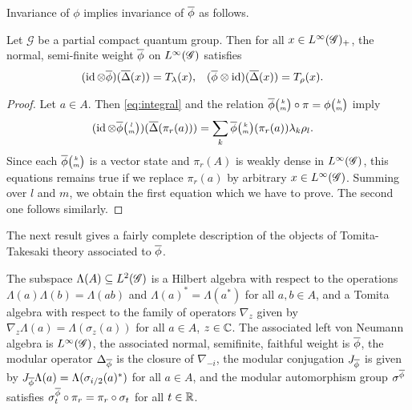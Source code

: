 Invariance of $\phi$ implies invariance of $\overline{\phi}$ as follows.
\begin{Prop} \label{prop:vn-invariance}
  Let $\mathscr{G}$ be a partial compact quantum group. Then for all
  $x\in L^{\infty}(\mathscr{G})_{+}$, the
  normal, semi-finite weight $\overline{\phi}$ on $L^{\infty}(\mathscr{G})$ satisfies
  \begin{align*}
    (\operatorname{id} \otimes \overline{\phi})(\overline{\Delta}(x)) &=  T_{\lambda}(x), &
    (\overline{\phi} \otimes \operatorname{id})(\overline{\Delta}(x)) &= T_{\rho}(x).
  \end{align*}
\end{Prop}
\begin{proof}
  Let  $a \in A$. Then 
 \eqref{eq:integral} and the relation
  $\overline{\phi}{\tiny {\begin{pmatrix} k\\m\end{pmatrix}}}\circ \pi = \phi{\tiny {\begin{pmatrix} k\\m\end{pmatrix}}}$ imply
  \begin{align*}
    (\operatorname{id} \otimes \overline{\phi}{\tiny {\begin{pmatrix} l\\m\end{pmatrix}}})(\overline{\Delta}(\pi_{r}(a))) &= \sum_{k}
    \overline{\phi}{\tiny {\begin{pmatrix} k\\m\end{pmatrix}}}(\pi_{r}(a)) \lambda_{k}\rho_{l}.
  \end{align*}
  Since each $\overline{\phi}{\tiny {\begin{pmatrix} k\\m\end{pmatrix}}}$ is a vector state and $\pi_{r}(A)$ is
  weakly dense in $L^{\infty}(\mathscr{G})$,  this equations
  remains true if we replace $\pi_{r}(a)$ by arbitrary $x\in
  L^{\infty}(\mathscr{G})$. Summing over $l$ and $m$, we  obtain the first equation
  which we have to prove. The second one follows similarly.
\end{proof}
The next result gives a fairly complete description of the objects of
Tomita-Takesaki theory associated to $\overline{\phi}$.
\begin{Lem} \label{lemma:vn-hilbert} The subspace
  $\Lambda(A) \subseteq L^{2}(\mathscr{G})$ is a Hilbert algebra with respect to
  the operations $\Lambda(a)\Lambda(b)=\Lambda(ab)$ and
  $\Lambda(a)^{*}= \Lambda(a^{*})$ for all $a,b\in A$, and a Tomita
  algebra with respect to the family of operators $\nabla_{z}$ given
  by $\nabla_{z}\Lambda(a)=\Lambda(\sigma_{z}(a))$ for all $a\in A$,
  $z\in \mathbb{C}$.  The associated left von Neumann
  algebra is $L^{\infty}(\mathscr{G})$, the associated normal, semifinite, faithful
  weight is $\overline{\phi}$, the modular operator  $\Delta_{\overline{\phi}}$ is the
  closure of $\nabla_{-i}$,  the modular conjugation $J_{\overline{\phi}}$ is
  given by $J_{\overline{\phi}}\Lambda(a)=\Lambda(\sigma_{i/2}(a)^{*})$ for all
  $a\in A$, and the modular automorphism group $\sigma^{\overline{\phi}}$
  satisfies $\sigma^{\overline{\phi}}_{t} \circ \pi_{r} = \pi_{r} \circ
  \sigma_{t}$ for all $t\in \mathbb{R}$.
\end{Lem}

